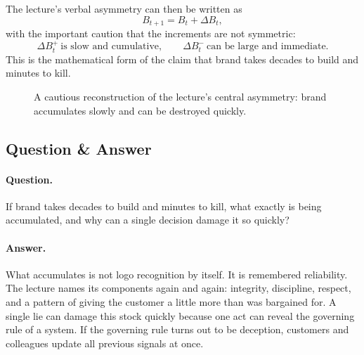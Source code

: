 The lecture's verbal asymmetry can then be written as
\begin{equation}
B_{t+1}=B_t+\Delta B_t,
\end{equation}
with the important caution that the increments are not symmetric:
\begin{equation}
\Delta B_t^{+}\ \text{is slow and cumulative},\qquad
\Delta B_t^{-}\ \text{can be large and immediate}.
\end{equation}
This is the mathematical form of the claim that brand takes decades to build and minutes to kill.

\begin{figure}[h]
\centering
{}
\caption{A cautious reconstruction of the lecture's central asymmetry: brand accumulates slowly and can be destroyed quickly.}
\end{figure}

\subsection{Question \& Answer}

\paragraph{Question.}
If brand takes decades to build and minutes to kill, what exactly is being accumulated, and why can a single decision damage it so quickly?

\paragraph{Answer.}
What accumulates is not logo recognition by itself. It is remembered reliability. The lecture names its components again and again: integrity, discipline, respect, and a pattern of giving the customer a little more than was bargained for. A single lie can damage this stock quickly because one act can reveal the governing rule of a system. If the governing rule turns out to be deception, customers and colleagues update all previous signals at once.

